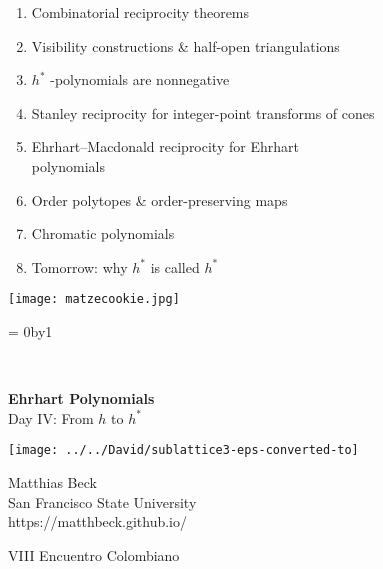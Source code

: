 \documentclass[landscape]{foils}
\def\mybullet{\green $\blacktriangleright$ \black}
\newcounter{frozenpage}
\def\thawpage{
  \count0=\thefrozenpage
  \advance\count0by1
  \renewcommand{\thepage}{\the\count0}
}
\def\green{\color{green}}
\def\blue{\color{blue}}
\def\black{\color{black}}
\def\bm{\blue $}
\def\em{$ \black }
\begin{document}
\vspace{-.5in}
\begin{enumerate}[\mybullet]
\item Combinatorial reciprocity theorems 
\item Visibility constructions \& half-open triangulations
\item \bm h^* \em\!\!-polynomials are nonnegative
\item Stanley reciprocity for integer-point transforms of cones
\item Ehrhart--Macdonald reciprocity for Ehrhart \\ polynomials
\item Order polytopes \& order-preserving maps
\item Chromatic polynomials
\item Tomorrow: why \bm h^* \em is called \bm h^* \em
\end{enumerate}

\vspace{-3.3in}
\hspace{6in}
\texttt{[image: matzecookie.jpg]}

\thawpage



\newpage
\thispagestyle{empty}
\

\begin{center}
  {\green\LARGE \textbf{Ehrhart Polynomials} \\[12pt]
\normalsize
Day IV: From $h$ to $h^*$}
\end{center}

\vspace{-.2in}
\texttt{[image: ../../David/sublattice3-eps-converted-to]}

\vspace{-4.5in} 
\blue
\hspace{5in}
Matthias Beck
\\[5pt]
\black
\hspace{5in}
San Francisco State University
\\[5pt]
\blue
\hspace{5in}
https://matthbeck.github.io/
\black

\vspace{1in} 
\hspace{5in}
VIII Encuentro Colombiano 
\end{document}
